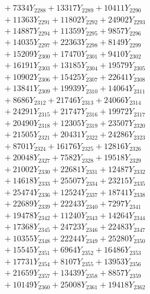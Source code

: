 \documentclass[a4paper,10pt]{article}
\begin{document}
{\begin{align}
&\;  + 7334 Y_{2288} + 13317 Y_{2289} + 10411 Y_{2290} \\[0.3ex]
&\;  + 11363 Y_{2291} + 11802 Y_{2292} + 24902 Y_{2293} \\[0.3ex]
&\;  + 14887 Y_{2294} + 11359 Y_{2295} + 9857 Y_{2296} \\[0.3ex]
&\;  + 14035 Y_{2297} + 22363 Y_{2298} + 8149 Y_{2299} \\[0.3ex]
&\;  + 15209 Y_{2300} + 17470 Y_{2301} + 9410 Y_{2302} \\[0.3ex]
&\;  + 16191 Y_{2303} + 13185 Y_{2304} + 19579 Y_{2305} \\[0.3ex]
&\;  + 10902 Y_{2306} + 15425 Y_{2307} + 22641 Y_{2308} \\[0.5ex]\allowbreak
&\;  + 13841 Y_{2309} + 19939 Y_{2310} + 14064 Y_{2311} \\[0.3ex]
&\;  + 8686 Y_{2312} + 21746 Y_{2313} + 24066 Y_{2314} \\[0.3ex]
&\;  + 24291 Y_{2315} + 21747 Y_{2316} + 19972 Y_{2317} \\[0.3ex]
&\;  + 20490 Y_{2318} + 12305 Y_{2319} + 23507 Y_{2320} \\[0.3ex]
&\;  + 21505 Y_{2321} + 20431 Y_{2322} + 24286 Y_{2323} \\[0.3ex]
&\;  + 8701 Y_{2324} + 16176 Y_{2325} + 12816 Y_{2326} \\[0.3ex]
&\;  + 20048 Y_{2327} + 7582 Y_{2328} + 19518 Y_{2329} \\[0.3ex]
&\;  + 21002 Y_{2330} + 22681 Y_{2331} + 12487 Y_{2332} \\[0.3ex]
&\;  + 14618 Y_{2333} + 25507 Y_{2334} + 23215 Y_{2335} \\[0.3ex]
&\;  + 25474 Y_{2336} + 12524 Y_{2337} + 18741 Y_{2338} \\[0.5ex]\allowbreak
&\;  + 22689 Y_{2339} + 22243 Y_{2340} + 7297 Y_{2341} \\[0.3ex]
&\;  + 19478 Y_{2342} + 11240 Y_{2343} + 14264 Y_{2344} \\[0.3ex]
&\;  + 17368 Y_{2345} + 24723 Y_{2346} + 22483 Y_{2347} \\[0.3ex]
&\;  + 10355 Y_{2348} + 22244 Y_{2349} + 25280 Y_{2350} \\[0.3ex]
&\;  + 15545 Y_{2351} + 6964 Y_{2352} + 16486 Y_{2353} \\[0.3ex]
&\;  + 17731 Y_{2354} + 8107 Y_{2355} + 13953 Y_{2356} \\[0.3ex]
&\;  + 21659 Y_{2357} + 13439 Y_{2358} + 8857 Y_{2359} \\[0.3ex]
&\;  + 10149 Y_{2360} + 25008 Y_{2361} + 19418 Y_{2362} \\[0.3ex]

\end{align}}
\end{document}
